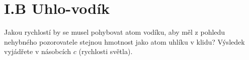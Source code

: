 \documentclass[crop=false]{standalone}
\begin{document}
\section*{I.B Uhlo-vodík}
Jakou rychlostí by se musel pohybovat atom vodíku, aby měl z pohledu nehybného pozorovatele stejnou hmotnost jako atom uhlíku v klidu? 
Výsledek vyjádřete v násobcích $c$ (rychlosti světla).
\end{document}
